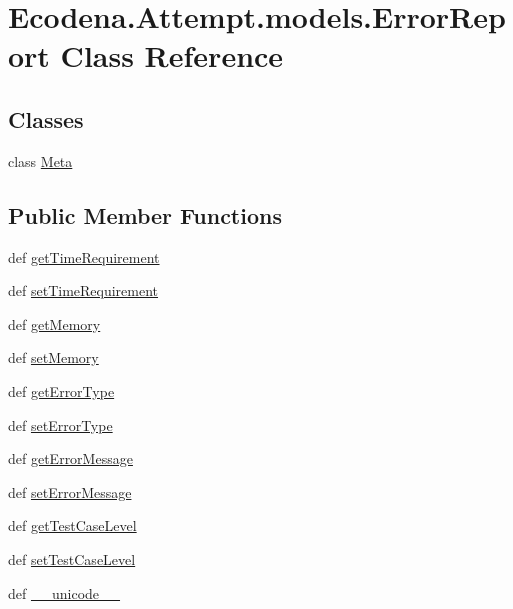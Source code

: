 \hypertarget{class_ecodena_1_1_attempt_1_1models_1_1_error_report}{
\section{Ecodena.Attempt.models.ErrorReport Class Reference}
\label{df/d02/class_ecodena_1_1_attempt_1_1models_1_1_error_report}
}
\subsection*{Classes}
\begin{DoxyCompactItemize}
\item 
class \hyperlink{class_ecodena_1_1_attempt_1_1models_1_1_error_report_1_1_meta}{Meta}
\end{DoxyCompactItemize}
\subsection*{Public Member Functions}
\begin{DoxyCompactItemize}
\item 
def \hyperlink{class_ecodena_1_1_attempt_1_1models_1_1_error_report_ac40ed2cade65a88a2cf17645254e2ff1}{getTimeRequirement}
\item 
def \hyperlink{class_ecodena_1_1_attempt_1_1models_1_1_error_report_a86aea8bb8422b2c469380dc172f53ee5}{setTimeRequirement}
\item 
def \hyperlink{class_ecodena_1_1_attempt_1_1models_1_1_error_report_a29de49227929585ef825e530bcf4fb6c}{getMemory}
\item 
def \hyperlink{class_ecodena_1_1_attempt_1_1models_1_1_error_report_a97b2d5371ac7edf1e74d849b3a2eb19e}{setMemory}
\item 
def \hyperlink{class_ecodena_1_1_attempt_1_1models_1_1_error_report_ac80d5ea52a38d411d1874aa9bfdce935}{getErrorType}
\item 
def \hyperlink{class_ecodena_1_1_attempt_1_1models_1_1_error_report_a7d0f8fbe2f7816dbcb210f52d2ad4725}{setErrorType}
\item 
def \hyperlink{class_ecodena_1_1_attempt_1_1models_1_1_error_report_ac23ed6ae46a4c923ddeaec0b57397160}{getErrorMessage}
\item 
def \hyperlink{class_ecodena_1_1_attempt_1_1models_1_1_error_report_a2080aea76dfbdaf3853ede3d8ef2931f}{setErrorMessage}
\item 
def \hyperlink{class_ecodena_1_1_attempt_1_1models_1_1_error_report_a546db782928ceb0232af249c93a7dfc8}{getTestCaseLevel}
\item 
def \hyperlink{class_ecodena_1_1_attempt_1_1models_1_1_error_report_af1ec9fcf090b07d29e5acce01bbd4fcc}{setTestCaseLevel}
\item 
def \hyperlink{class_ecodena_1_1_attempt_1_1models_1_1_error_report_a7d15794e217da1e0d09e1f16ba804d49}{\_\-\_\-unicode\_\-\_\-}
\end{DoxyCompactItemize}
